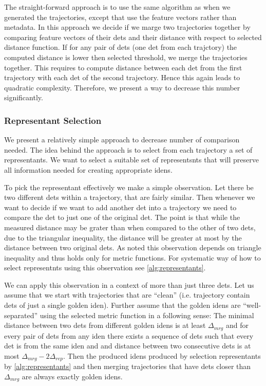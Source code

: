 The straight-forward approach is to use the same algorithm as when we
generated the trajectories, except that use the feature vectors
rather than metadata. In this approach we decide if we marge two trajectories
together by comparing feature vectors of their \glspl{det} and their distance
with respect to selected distance function. If for any pair of \glspl{det} 
(one \gls{det} from each trajctory) the computed distance is lower then selected
threshold, we merge the trajectories together. This requires to compute distance
between each \gls{det} from the first trajectory with each \gls{det} of the
second trajectory. Hence this again leads to quadratic complexity.
Therefore, we present a way to decrease this number significantly.

\subsubsection{Representant Selection}

We present a relatively simple approach to decrease number of comparison needed.
The idea behind the approach is to select from each trajectory a set of
representants. We want to select a  suitable set of representsnts that will
preserve all information needed for creating appropriate \glspl{iden}.

To pick the representant effectively we make a simple observation. Let there be
two different \glspl{det} within a trajectory, that are fairly similar. Then
whenever we want to decide if we want to add another \gls{det} into a trajectory
we need to compare the \gls{det} to just one of the original \gls{det}. The
point is that while the measured distance may be grater than when compared
to the other of two \glspl{det}, due to the triangular inequality, the distance
will be greater at most by the distance between two original \glspl{det}.
As noted this observation depends on triangle inequality and thus holds only
for metric functions.
For systematic way of how to select representnts using this observation
see \autoref{alg:representants}.

We can apply this observation in a context of more than just three \glspl{det}.
Let us assume that we  start with trajectories that are ``clean'' (i.e.
trajectory contain \glspl{det} of just a single golden \gls{iden}). Further
assume that the golden \glspl{iden} are ``well-separated'' using the selected
metric function in a following sense: The minimal distance between two
\glspl{det} from different golden \glspl{iden} is at least $\Delta_{mrg}$
and for every pair of \glspl{det} from any \gls{iden} there exists a sequence
of \glspl{det} such that every \gls{det} is from the same \gls{iden} and
and distance between two consecutive \glspl{det} is at most
$\Delta_{mrg} - 2\Delta_{rep}$. Then the produced \glspl{iden} produced by
selection representants by \autoref{alg:representants} and then merging
trajectories that have \glspl{det} closer than $\Delta_{mrg}$
are always exactly golden \glspl{iden}.


